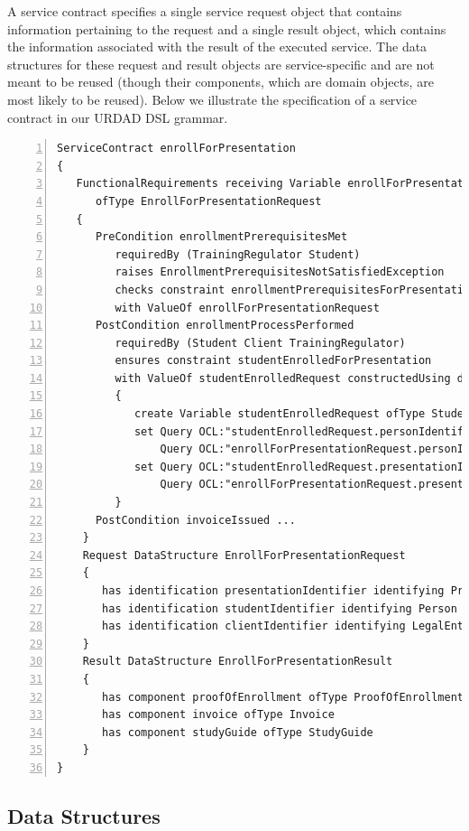 A service contract specifies a single service request object that contains information pertaining to the request and a single result object, which contains the information associated with the result of the executed service. The data structures for these request and result objects are service-specific and are not meant to be reused (though their components, which are domain objects, are most likely to be reused). Below we illustrate the specification of a service contract in our URDAD DSL grammar.
\tiny \begin{lstlisting}[numbers=left,escapechar=|]
ServiceContract enrollForPresentation
{
   FunctionalRequirements receiving Variable enrollForPresentationRequest 
      ofType EnrollForPresentationRequest
   {
      PreCondition enrollmentPrerequisitesMet
         requiredBy (TrainingRegulator Student) 
         raises EnrollmentPrerequisitesNotSatisfiedException
         checks constraint enrollmentPrerequisitesForPresentationMet
         with ValueOf enrollForPresentationRequest
      PostCondition enrollmentProcessPerformed
         requiredBy (Student Client TrainingRegulator)
         ensures constraint studentEnrolledForPresentation 
         with ValueOf studentEnrolledRequest constructedUsing doSequential
         {
            create Variable studentEnrolledRequest ofType StudentEnrolledRequest
            set Query OCL:"studentEnrolledRequest.personIdentifier" equalTo
                Query OCL:"enrollForPresentationRequest.personIdentifier"                            
            set Query OCL:"studentEnrolledRequest.presentationIdentifier" equalTo
                Query OCL:"enrollForPresentationRequest.presentationIdentifier"                            
         }  
      PostCondition invoiceIssued ...
    }            
    Request DataStructure EnrollForPresentationRequest 
    {
       has identification presentationIdentifier identifying Presentation
       has identification studentIdentifier identifying Person
       has identification clientIdentifier identifying LegalEntity         
    }
    Result DataStructure EnrollForPresentationResult 
    {
       has component proofOfEnrollment ofType ProofOfEnrollment
       has component invoice ofType Invoice
       has component studyGuide ofType StudyGuide
    }
}
\end{lstlisting}\normalsize

\subsection{Data Structures}


